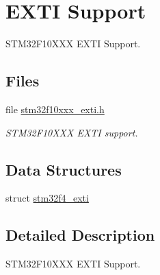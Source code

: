 \hypertarget{group__stm32f4__exti}{}\section{E\+X\+TI Support}
\label{group__stm32f4__exti}


S\+T\+M32\+F10\+X\+XX E\+X\+TI Support.  


\subsection*{Files}
\begin{DoxyCompactItemize}
\item 
file \mbox{\hyperlink{stm32f10xxx__exti_8h}{stm32f10xxx\+\_\+exti.\+h}}
\begin{DoxyCompactList}\small\item\em S\+T\+M32\+F10\+X\+XX E\+X\+TI support. \end{DoxyCompactList}\end{DoxyCompactItemize}
\subsection*{Data Structures}
\begin{DoxyCompactItemize}
\item 
struct \mbox{\hyperlink{structstm32f4__exti}{stm32f4\+\_\+exti}}
\end{DoxyCompactItemize}


\subsection{Detailed Description}
S\+T\+M32\+F10\+X\+XX E\+X\+TI Support. 

